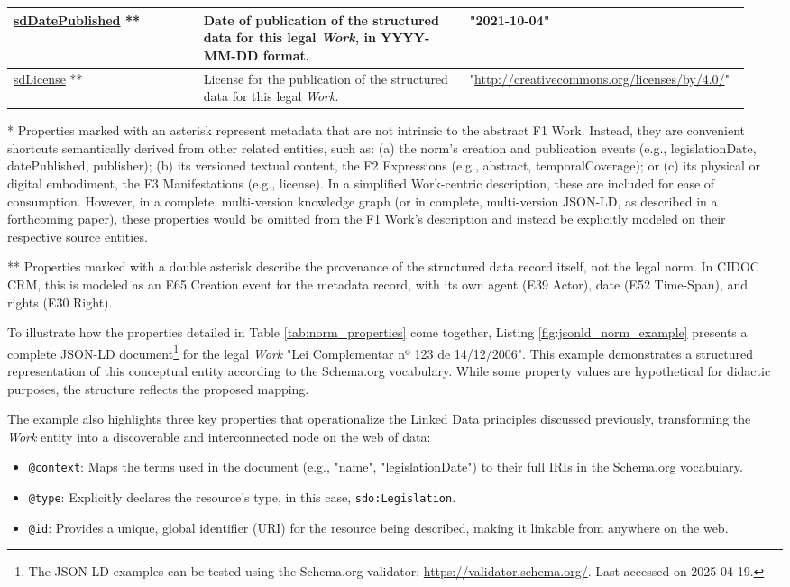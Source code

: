\documentclass[11pt]{article}
\begin{document}
\begin{longtable}{p{0.25\linewidth} p{0.35\linewidth} p{0.35\linewidth}}
\url{sdDatePublished} ** & Date of publication of the structured data for this legal \emph{Work}, in YYYY-MM-DD format. & "2021-10-04" \\
\midrule

\url{sdLicense} ** & License for the publication of the structured data for this legal \emph{Work}. & "\url{http://creativecommons.org/licenses/by/4.0/}" \\
\bottomrule

\end{longtable}

* Properties marked with an asterisk represent metadata that are not intrinsic to the abstract F1 Work. Instead, they are convenient shortcuts semantically derived from other related entities, such as: (a) the norm's creation and publication events (e.g., legislationDate, datePublished, publisher); (b) its versioned textual content, the F2 Expressions (e.g., abstract, temporalCoverage); or (c) its physical or digital embodiment, the F3 Manifestations (e.g., license). In a simplified Work-centric description, these are included for ease of consumption. However, in a complete, multi-version knowledge graph (or in complete, multi-version JSON-LD, as described in a forthcoming paper), these properties would be omitted from the F1 Work's description and instead be explicitly modeled on their respective source entities.

** Properties marked with a double asterisk describe the provenance of the structured data record itself, not the legal norm. In CIDOC CRM, this is modeled as an E65 Creation event for the metadata record, with its own agent (E39 Actor), date (E52 Time-Span), and rights (E30 Right).

To illustrate how the properties detailed in Table \ref{tab:norm_properties} come together, Listing \ref{fig:jsonld_norm_example} presents a complete JSON-LD document\footnote{The JSON-LD examples can be tested using the Schema.org validator: \url{https://validator.schema.org/}. Last accessed on 2025-04-19.} for the legal \textit{Work} "Lei Complementar nº 123 de 14/12/2006". This example demonstrates a structured representation of this conceptual entity according to the Schema.org vocabulary. While some property values are hypothetical for didactic purposes, the structure reflects the proposed mapping.

The example also highlights three key properties that operationalize the Linked Data principles discussed previously, transforming the \textit{Work} entity into a discoverable and interconnected node on the web of data:
\begin{itemize}[leftmargin=*]
    \item \texttt{@context}: Maps the terms used in the document (e.g., "name", "legislationDate") to their full IRIs in the Schema.org vocabulary.
    \item \texttt{@type}: Explicitly declares the resource's type, in this case, \texttt{sdo:Legislation}.
    \item \texttt{@id}: Provides a unique, global identifier (URI) for the resource being described, making it linkable from anywhere on the web.
\end{itemize}
\end{document}
